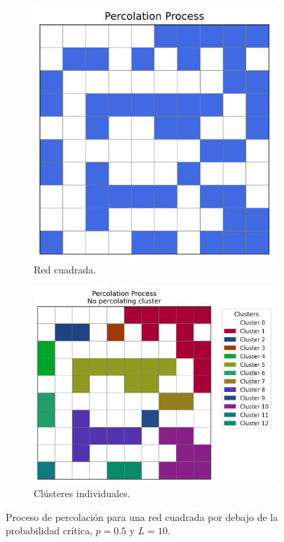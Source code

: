 \documentclass[12pt,a4paper]{article}
\begin{document}
\begin{figure}[H]
    \centering
    \begin{subfigure}[h]{0.4\textwidth}
        \centering
        \includegraphics[width=0.75\linewidth]{../figures/percolation1.png}
        \caption{Red cuadrada.}
        \label{fig:subfig1}
    \end{subfigure}
    \hspace{0.02 cm}
    \begin{subfigure}[h]{0.45\textwidth}
        \centering
        \includegraphics[width=0.9\linewidth]{../figures/clusterpercolation1.png}
        \caption{Clústeres individuales.}
        \label{fig:subfig2}
    \end{subfigure}
    \caption{Proceso de percolación para una red cuadrada por debajo de la probabilidad crítica, \( p = 0.5 \) y \( L = 10 \).}
    \label{fig:1}
\end{figure}
\end{document}
